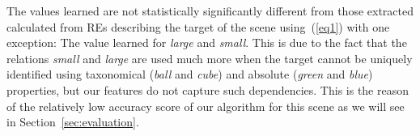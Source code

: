 The values learned are not statistically significantly different from those extracted calculated from REs describing the target of the scene using~(\ref{eq1}) with one exception: The value learned for \emph{large} and \emph{small}. This is due to the fact that the relations \emph{small} and \emph{large} are used much more when the target cannot be uniquely identified using taxonomical (\emph{ball} and \emph{cube}) and absolute (\emph{green} and \emph{blue}) properties, but our features do not capture such dependencies. This is the reason of the relatively low accuracy score of our algorithm for this scene as we will see in Section~\ref{sec:evaluation}. 
%


